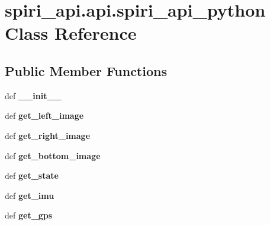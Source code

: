 \hypertarget{classspiri__api_1_1api_1_1spiri__api__python}{\section{spiri\-\_\-api.\-api.\-spiri\-\_\-api\-\_\-python \-Class \-Reference}
\label{classspiri__api_1_1api_1_1spiri__api__python}
}
\subsection*{\-Public \-Member \-Functions}
\begin{DoxyCompactItemize}
\item 
\hypertarget{classspiri__api_1_1api_1_1spiri__api__python_ab9c7abbaa45f26d99e3252b381b24d3b}{def {\bfseries \-\_\-\-\_\-init\-\_\-\-\_\-}}\label{classspiri__api_1_1api_1_1spiri__api__python_ab9c7abbaa45f26d99e3252b381b24d3b}

\item 
\hypertarget{classspiri__api_1_1api_1_1spiri__api__python_a7eb16bb2af3be782182c6c5d29c66d5c}{def {\bfseries get\-\_\-left\-\_\-image}}\label{classspiri__api_1_1api_1_1spiri__api__python_a7eb16bb2af3be782182c6c5d29c66d5c}

\item 
\hypertarget{classspiri__api_1_1api_1_1spiri__api__python_a6718cca393fdcf3973433a9caff9692d}{def {\bfseries get\-\_\-right\-\_\-image}}\label{classspiri__api_1_1api_1_1spiri__api__python_a6718cca393fdcf3973433a9caff9692d}

\item 
\hypertarget{classspiri__api_1_1api_1_1spiri__api__python_ad1de6db2241aef693fe993c9c10d6600}{def {\bfseries get\-\_\-bottom\-\_\-image}}\label{classspiri__api_1_1api_1_1spiri__api__python_ad1de6db2241aef693fe993c9c10d6600}

\item 
\hypertarget{classspiri__api_1_1api_1_1spiri__api__python_abd31f9351da53d2a0dc8bb656ca8b613}{def {\bfseries get\-\_\-state}}\label{classspiri__api_1_1api_1_1spiri__api__python_abd31f9351da53d2a0dc8bb656ca8b613}

\item 
\hypertarget{classspiri__api_1_1api_1_1spiri__api__python_a23787a36c6d9d4bae07d60fe2ca30185}{def {\bfseries get\-\_\-imu}}\label{classspiri__api_1_1api_1_1spiri__api__python_a23787a36c6d9d4bae07d60fe2ca30185}

\item 
\hypertarget{classspiri__api_1_1api_1_1spiri__api__python_a2f7b00bdd455b6b289e6a3324f4644f4}{def {\bfseries get\-\_\-gps}}\label{classspiri__api_1_1api_1_1spiri__api__python_a2f7b00bdd455b6b289e6a3324f4644f4}


\end{DoxyCompactItemize}

